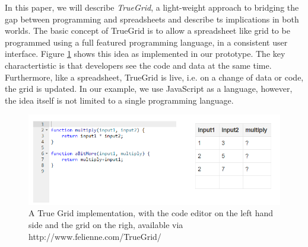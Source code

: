 \documentclass{llncs}
\begin{document}


 
In this paper, we will describe \textit{TrueGrid}, a light-weight approach to bridging the gap between programming and spreadsheets and describe ts implications in both worlds. The basic concept of TrueGrid is to allow a spreadsheet like grid to be programmed using a full featured programming language, in a consistent user interface. Figure \ref{fig:TG} shows this idea as implemented in our prototype. 
The key charactertistic is that  developers see the code and data at the same time. Furthermore, like a spreadsheet, TrueGrid is live, i.e. on a change of data or code, the grid is updated.
In our example, we use JavaScript as a language, however, the idea itself is not limited to a single programming language.

\begin{figure}
  \begin{center}
  \includegraphics[width=12cm]{fig/TG.png}
  \caption{A True Grid implementation, with the code editor on the left hand side and the grid on the righ, available via http://www.felienne.com/TrueGrid/}
  \label{fig:TG}
  \end{center}
\end{figure} 
\end{document}

